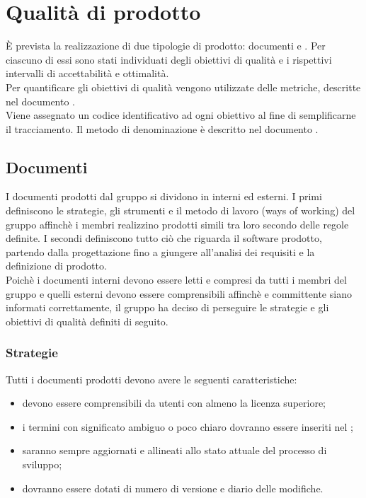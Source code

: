 \documentclass[PdQ.tex]{subfiles}
\begin{document}
\section{Qualità di prodotto}
	È prevista la realizzazione di due tipologie di prodotto: documenti e . Per ciascuno di essi sono stati individuati
	degli obiettivi di qualità e i rispettivi intervalli di accettabilità e ottimalità. \\
	Per quantificare gli obiettivi di qualità vengono utilizzate delle metriche, descritte nel documento \NPdoc{}. \\
	Viene assegnato un codice identificativo ad ogni obiettivo al fine di semplificarne il tracciamento. Il metodo di denominazione
	è descritto nel documento \NPdoc{}.

	\subsection{Documenti}
		I documenti prodotti dal gruppo \GRUPPO{} si dividono in interni ed esterni. I primi definiscono le strategie, gli strumenti e il metodo di lavoro (ways of working)
		del gruppo affinchè i membri realizzino prodotti simili tra loro secondo delle regole definite. I secondi definiscono tutto ciò che riguarda il software prodotto,
		partendo dalla progettazione fino a giungere all'analisi dei requisiti e la definizione di prodotto. \\
		Poichè i documenti interni devono essere letti e compresi da tutti i membri del gruppo e quelli esterni devono essere comprensibili affinchè  e committente
		siano informati correttamente, il gruppo ha deciso di perseguire le strategie e gli obiettivi di qualità definiti di seguito.

		\subsubsection{Strategie}
		Tutti i documenti prodotti devono avere le seguenti caratteristiche:
		\begin{itemize}
			\item devono essere comprensibili da utenti con almeno la licenza superiore;
			\item i termini con significato ambiguo o poco chiaro dovranno essere inseriti nel \Gldoc{};
			\item saranno sempre aggiornati e allineati allo stato attuale del processo di sviluppo;
			\item dovranno essere dotati di numero di versione e diario delle modifiche.
		\end{itemize}
\end{document}

